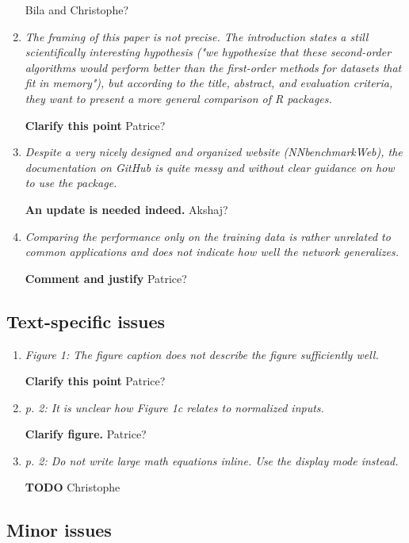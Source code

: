 \documentclass[12pt]{article}
\newcommand{\red}[1]{{\color{red}#1}}
\begin{document}
\begin{enumerate}
\red{Bila and Christophe?}


\item \textit{The framing of this paper is not precise. The introduction states a still scientifically interesting hypothesis ("we hypothesize that these second-order algorithms would perform better than the first-order methods for datasets that fit in memory"), but according to the title, abstract, and evaluation criteria, they want to present a more general comparison of R packages.}

\textbf{Clarify this point}
\red{Patrice?}


\item \textit{Despite a very nicely designed and organized website (NNbenchmarkWeb), the documentation on GitHub is quite messy and without clear guidance on how to use the package.}

\textbf{An update is needed indeed.}
\red{Akshaj?}


\item \textit{Comparing the performance only on the training data is rather unrelated to common applications and does not indicate how well the network generalizes.}

\textbf{Comment and justify}
\red{Patrice?}

\end{enumerate}

\subsection*{Text-specific issues}

\begin{enumerate}
\item \textit{Figure 1: The figure caption does not describe the figure sufficiently well.}

\textbf{Clarify this point}
\red{Patrice?}

\item \textit{p. 2: It is unclear how Figure 1c relates to normalized inputs.}

\textbf{Clarify figure.}
\red{Patrice?}

\item \textit{p. 2: Do not write large math equations inline. Use the display mode instead.}

\textbf{TODO}
\red{Christophe}

\end{enumerate}

\subsection*{Minor issues}
\end{document}
